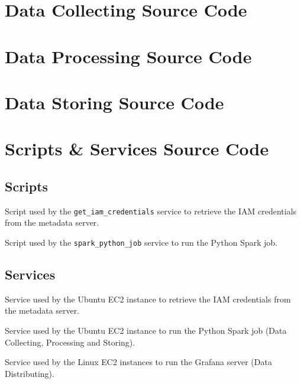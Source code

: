 \documentclass[12pt,oneside]{book} %
\begin{document}
\begin{appendices}
\begin{subappendices}
        \section{Data Collecting Source Code}
        \lstset{style=python}
        

        \section{Data Processing Source Code}
        \lstset{style=python}
        

        \section{Data Storing Source Code}
        \lstset{style=python}
        

        \section { Scripts \& Services Source Code }
        \subsection{Scripts}

        Script used by the \texttt{get\_iam\_credentials} service to retrieve the IAM
        credentials from the metadata server. \lstset{style=terminal}
        

        Script used by the \texttt{spark\_python\_job} service to run the Python Spark
        job. \lstset{style=terminal}
        

        \subsection{Services}

        Service used by the Ubuntu EC2 instance to retrieve the IAM credentials from
        the metadata server. \lstset{style=terminal}
        

        Service used by the Ubuntu EC2 instance to run the Python Spark job (Data
        Collecting, Processing and Storing). \lstset{style=terminal}
        

        Service used by the Linux EC2 instances to run the Grafana server (Data
        Distributing). \lstset{style=terminal}
        
    \end{subappendices}
\end{appendices}
\end{document}
